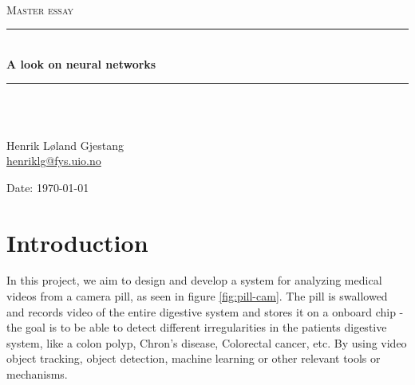 \documentclass[english, a4paper]{report}
\begin{document}
\begin{titlepage}
\begin{center}

\textsc{}\\[1.0cm]
\textsc{\Large Master essay}\\[0.5cm]
\rule{\linewidth}{0.5mm} \\[0.4cm]
{ \huge \bfseries A look on neural networks}\\[0.10cm]
\rule{\linewidth}{0.5mm} \\[1.5cm]
\textsc{}\\[7.0cm]

\begin{minipage}{0.69\textwidth}
    \begin{center} \large
        Henrik Løland Gjestang\\ \url{henriklg@fys.uio.no} \\[0.8cm]
    \end{center}
\end{minipage}
\vfill

\large{Date: \today}
\end{center}
\end{titlepage}

\tableofcontents
\newpage




\section{Introduction}

In this project, we aim to design and develop a system for analyzing medical videos from a camera pill, as seen in figure \ref{fig:pill-cam}. The pill is swallowed and records video of the entire digestive system and stores it on a onboard chip - the goal is to be able to detect different irregularities in the patients digestive system, like a colon polyp, Chron's disease, Colorectal cancer, etc. By using video object tracking, object detection, machine learning or other relevant tools or mechanisms.
\end{document}
